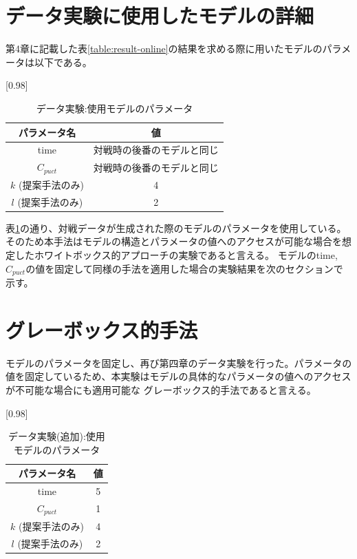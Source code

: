 \section{データ実験に使用したモデルの詳細}
第4章に記載した表\ref{table:result-online}の結果を求める際に用いたモデルのパラメータは以下である。
\begin{table}[H]
	\caption{データ実験:使用モデルのパラメータ}
	\centering
	\scalebox{0.98}[0.98]{
		\begin{tabular}{c|c}
			パラメータ名 & 値 \\ \hline
			time    & 対戦時の後番のモデルと同じ \\ 
			$C_{puct}$    & 対戦時の後番のモデルと同じ \\
			$k$ (提案手法のみ)     & 4 \\
			$l$ (提案手法のみ)     & 2 \\
		\end{tabular}
	}
	\label{table:param-data}
\end{table}

表\ref{table:param-data}の通り、対戦データが生成された際のモデルのパラメータを使用している。
そのため本手法はモデルの構造とパラメータの値へのアクセスが可能な場合を想定したホワイトボックス的アプローチの実験であると言える。
モデルのtime, $C_{puct}$の値を固定して同様の手法を適用した場合の実験結果を次のセクションで示す。
\section{グレーボックス的手法}
モデルのパラメータを固定し、再び第四章のデータ実験を行った。パラメータの値を固定しているため、本実験はモデルの具体的なパラメータの値へのアクセスが不可能な場合にも適用可能な
グレーボックス的手法であると言える。
\begin{table}[H]
	\caption{データ実験(追加):使用モデルのパラメータ}
	\centering
	\scalebox{0.98}[0.98]{
		\begin{tabular}{c|c}
			パラメータ名 & 値 \\ \hline
			time    & 5 \\ 
			$C_{puct}$    & 1 \\
			$k$ (提案手法のみ)     & 4 \\
			$l$ (提案手法のみ)     & 2 \\
		\end{tabular}
	}
	\label{table:param-data-extra}
\end{table}

